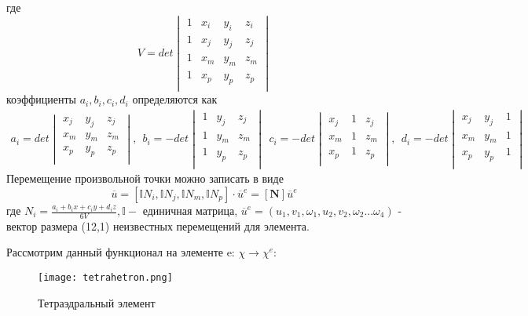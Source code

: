 \documentclass[a4paper,12pt]{article}
\begin{document}
где
\begin{equation}
    V = det
    \begin{vmatrix}
1 & x_i & y_i & z_i \\ 
1 & x_j & y_j & z_j \\ 
1 & x_m & y_m & z_m \\ 
1 & x_p & y_p & z_p \\
    \end{vmatrix}
\end{equation}
коэффициенты $a_i, b_i, c_i, d_i$ определяются как
\begin{align}
    a_i =    det 
    \begin{vmatrix}
 x_j & y_j & z_j \\ 
x_m & y_m & z_m \\ 
x_p & y_p & z_p \\
    \end{vmatrix},
\:\: b_i  = -det 
    \begin{vmatrix} 
1 & y_j & z_j \\ 
1 & y_m & z_m \\ 
1 & y_p & z_p \\
    \end{vmatrix}
\:\: c_i =     -det \begin{vmatrix}
 x_j & 1 & z_j \\ 
x_m & 1 & z_m \\ 
x_p & 1 & z_p \\
    \end{vmatrix},
\:\: d_i =     -det\begin{vmatrix}
 x_j & y_j & 1 \\ 
x_m & y_m & 1 \\ 
x_p & y_p & 1 \\
    \end{vmatrix}
\end{align}
Перемещение произвольной точки можно записать в виде 
\begin{equation}
    \overline{u} = [\mathbb{I} N_i,\mathbb{I} N_j,\mathbb{I} N_m,\mathbb{I} N_p] \cdot \overline{u}^e = [\textbf{N}] \overline{u}^e
\end{equation}
где $N_i = \frac{a_i + b_i x + c_i y + d_i z}{6V}, \mathbb{I} - $ единичная матрица, $\overline{u}^e = (u_1, v_1,\omega_1, u_2, v_2,  \omega_2 ...\omega_4) $ - вектор размера (12,1) неизвестных перемещений для элемента. \par
Рассмотрим данный функционал на элементе e: $\chi \rightarrow \chi^e$:

\begin{figure}[H]
    \centering
    \texttt{[image: tetrahetron.png]}
    \caption{Тетраэдральный элемент}
    \label{fig:enter-label}
\end{figure}
\end{document}
